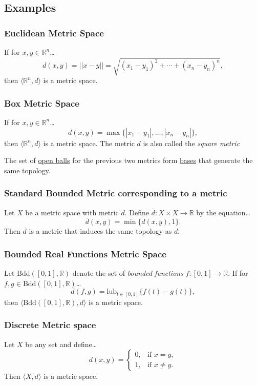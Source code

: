 \subsection{Examples}\label{metricexamples}

\subsubsection{Euclidean Metric Space}\label{euclideanmetric}

If for $x,y \in \mathbb{R}^n$\dots
$$d(x,y) = ||x-y|| = \sqrt{(x_1 - y_1)^2 + \cdots + (x_n - y_n)^n},$$
then $\langle \mathbb{R}^n,d \rangle$ is a metric space.

\subsubsection{Box Metric Space}\label{euclideanmetric}

If for $x,y \in \mathbb{R}^n$\dots
$$d(x,y) = \max\{|x_1 - y_1|, \dots, |x_n - y_n|\},$$
then $\langle \mathbb{R}^n,d \rangle$ is a metric space. The metric
$d$ is also called the \emph{square metric}\newline

\noindent The set of \hyperref[metricopenball]{open balls} for the previous two metrics form \hyperref[basis]{bases} that generate the same topology.

\subsubsection{Standard Bounded Metric corresponding to a metric}\label{standardbounded}

Let $X$ be a metric space with metric $d$. Define $\overline{d} : X \times X \rightarrow \mathbb{R}$ by the equation\dots
$$\overline{d} (x,y) = \min \{ d(x,y), 1 \}.$$
Then $\overline{d}$ is a metric that induces the same topology as $d$.

\subsubsection{Bounded Real Functions Metric Space}\label{bddmetric}

Let $\textrm{Bdd}([0,1],\mathbb{R})$ denote the set of \emph{bounded functions} $f : [0,1] \rightarrow \mathbb{R}$. If for $f,g \in \textrm{Bdd}([0,1],\mathbb{R})$\dots
$$d(f,g) = \textrm{lub}_{t \in [0,1]}\{f(t) - g(t)\},$$
then $\langle \textrm{Bdd}([0,1],\mathbb{R}),d \rangle$ is a metric space.

\subsubsection{Discrete Metric space}\label{discretemetric}

Let $X$ be any set and define\dots
\[
	d(x,y) = \begin{cases}
				0, & \textrm{if } x = y,\\
				1, & \textrm{if } x \neq y.
			 \end{cases}
\]
Then $\langle X,d \rangle$ is a metric space.